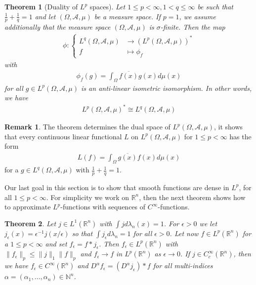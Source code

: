 \documentclass[11pt,a4paper]{article}
\newtheorem{thm}{Theorem}[section]
\theoremstyle{definition}
\newtheorem{rem}{Remark}[section]
\begin{document}
\begin{thm}[Duality of $L^p$ spaces] Let $1 \leq p < \infty, 1 < q \leq \infty$ be such that $\frac{1}{p} + \frac{1}{q}=1$ and let $( \Omega, \mathcal{A}, \mu)$ be a measure space. If $p=1$, we assume additionally that the measure space $( \Omega, \mathcal{A}, \mu)$ is $\sigma$-finite.  Then the map
\begin{align*}
\phi : \begin{cases} L^q(\Omega, \mathcal{A}, \mu) & \longrightarrow(L^p (\Omega, \mathcal{A}, \mu))^* \\
f & \longmapsto \phi_f \end{cases}
\end{align*}
with 
\begin{align*}
\phi_f(g) = \int_\Omega \overline{f(x)}g(x) d \mu(x)
\end{align*}
for all $g \in L^p(\Omega, \mathcal{A}, \mu)$ is an anti-linear isometric isomorphism. In other words, we have
\begin{align*}
L^p(\Omega, \mathcal{A}, \mu)^* \cong L^q(\Omega, \mathcal{A}, \mu)
\end{align*}
\end{thm}
\begin{rem} The theorem determines the dual space of $L^p(\Omega, \mathcal{A}, \mu)$, it shows that every continuous linear functional $L$ on $L^p(\Omega, \mathcal{A}, \mu)$ for $1 \leq p < \infty$ has the form 
\begin{align*}
L(f)= \int_\Omega \overline{g(x)} f(x) d \mu(x)
\end{align*}
for a $g \in L^q(\Omega, \mathcal{A}, \mu)$ with $\frac{1}{p} + \frac{1}{q}=1$. 
\end{rem}
Our last goal in this section is to show that smooth functions are dense in $L^p$, for all $1 \leq p < \infty$. For simplicity we work on $\mathbb{R}^n$, then the next theorem shows how to approximate $L^p$-functions with sequences of $C^\infty$-functions.
\begin{thm} Let $j \in L^1 ( \mathbb{R}^n)$ with $\int j d \lambda_n(x) =1$. For $\epsilon >0$ we let $j_\epsilon(x) = \epsilon^{-1} j(x/ \epsilon)$ so that $\int j_\epsilon d\lambda_n =1$ for all $\epsilon >0$. Let now $f \in L^p( \mathbb{R}^n)$ for a $1 \leq p < \infty$ and set $f_ \epsilon = f * j_\epsilon$. Then $f_\epsilon \in L^p( \mathbb{R}^n)$ with $\|f_\epsilon \|_p \leq \|j\|_1 \|f\|_p$ and $f_\epsilon\to f $ in $L^p( \mathbb{R}^n)$ as $\epsilon \to 0$. If $j \in C_c^\infty ( \mathbb{R}^n)$, then we have $f_\epsilon \in C^\infty ( \mathbb{R}^n)$ and $D^\alpha f_\epsilon = (D^\alpha j_\epsilon) * f$ for all multi-indices $\alpha= ( \alpha_1, \dots, \alpha_n) \in \mathbb{N}^n$. 
\end{thm}
\end{document}
